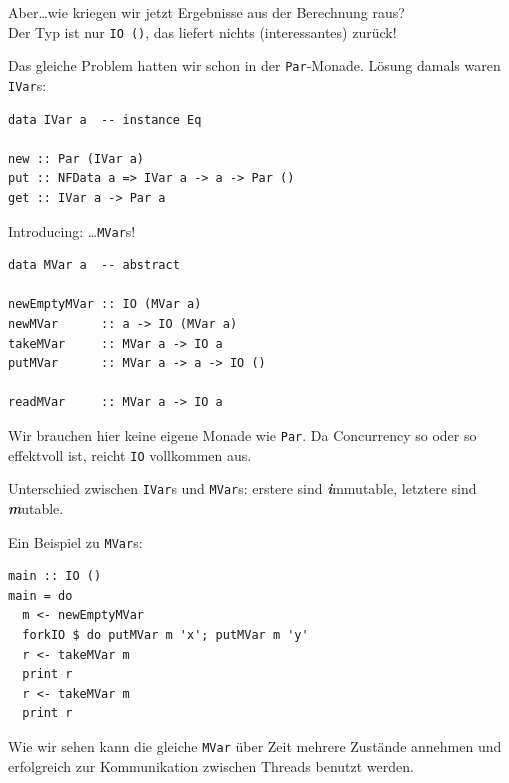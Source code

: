\documentclass{beamer}
\begin{document}

\begin{frame}[fragile]

Aber\dots \pause wie kriegen wir jetzt Ergebnisse aus der Berechnung raus?\\
Der Typ ist nur \texttt{IO ()}, das liefert nichts (interessantes) zurück!\pause\bigskip

Das gleiche Problem hatten wir schon in der \texttt{Par}-Monade. Lösung damals waren
\texttt{IVar}s:\bigskip

\begin{verbatim}
data IVar a  -- instance Eq

new :: Par (IVar a)
put :: NFData a => IVar a -> a -> Par ()
get :: IVar a -> Par a
\end{verbatim}
\end{frame}


\begin{frame}[fragile]

Introducing: \dots \pause \texttt{MVar}s!\bigskip

\begin{verbatim}
data MVar a  -- abstract

newEmptyMVar :: IO (MVar a)
newMVar      :: a -> IO (MVar a)
takeMVar     :: MVar a -> IO a
putMVar      :: MVar a -> a -> IO ()

readMVar     :: MVar a -> IO a
\end{verbatim}
\pause

Wir brauchen hier keine eigene Monade wie \texttt{Par}. Da Concurrency so oder so
effektvoll ist, reicht \texttt{IO} vollkommen aus.\bigskip

Unterschied zwischen \texttt{IVar}s und \texttt{MVar}s: erstere sind \emph{\textbf{i}}mmutable,
letztere sind \emph{\textbf{m}}utable.

\end{frame}


\begin{frame}[fragile]

Ein Beispiel zu \texttt{MVar}s:

\begin{verbatim}
main :: IO ()
main = do
  m <- newEmptyMVar
  forkIO $ do putMVar m 'x'; putMVar m 'y'
  r <- takeMVar m
  print r
  r <- takeMVar m
  print r
\end{verbatim}
\pause

Wie wir sehen kann die gleiche \texttt{MVar} über Zeit mehrere Zustände annehmen
und erfolgreich zur Kommunikation zwischen Threads benutzt werden. 

\end{frame}
\end{document}
